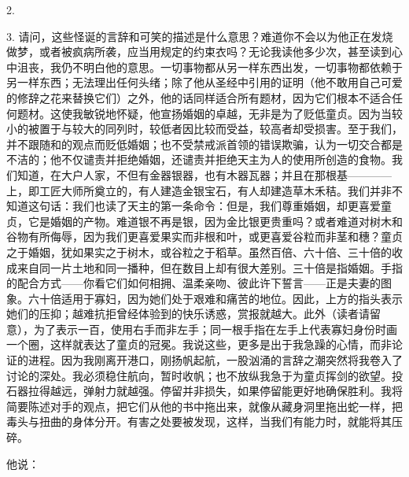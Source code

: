 2. \par

3. 请问，这些怪诞的言辞和可笑的描述是什么意思？难道你不会以为他正在发烧做梦，或者被疯病所袭，应当用规定的约束衣吗？无论我读他多少次，甚至读到心中沮丧，我仍不明白他的意思。一切事物都从另一样东西出发，一切事物都依赖于另一样东西；无法理出任何头绪；除了他从圣经中引用的证明（他不敢用自己可爱的修辞之花来替换它们）之外，他的话同样适合所有题材，因为它们根本不适合任何题材。这使我敏锐地怀疑，他宣扬婚姻的卓越，无非是为了贬低童贞。因为当较小的被置于与较大的同列时，较低者因比较而受益，较高者却受损害。至于我们，并不跟随和的观点而贬低婚姻；也不受禁戒派首领的错误欺骗，认为一切交合都是不洁的；他不仅谴责并拒绝婚姻，还谴责并拒绝天主为人的使用所创造的食物。我们知道，在大户人家，不但有金器银器，也有木器瓦器；并且在那根基————上，即工匠大师所奠立的，有人建造金银宝石，有人却建造草木禾秸。我们并非不知道这句话：我们也读了天主的第一条命令：但是，我们尊重婚姻，却更喜爱童贞，它是婚姻的产物。难道银不再是银，因为金比银更贵重吗？或者难道对树木和谷物有所侮辱，因为我们更喜爱果实而非根和叶，或更喜爱谷粒而非茎和穗？童贞之于婚姻，犹如果实之于树木，或谷粒之于稻草。虽然百倍、六十倍、三十倍的收成来自同一片土地和同一播种，但在数目上却有很大差别。三十倍是指婚姻。手指的配合方式——你看它们如何相拥、温柔亲吻、彼此许下誓言——正是夫妻的图象。六十倍适用于寡妇，因为她们处于艰难和痛苦的地位。因此，上方的指头表示她们的压抑；越难抗拒曾经体验到的快乐诱惑，赏报就越大。此外（读者请留意），为了表示一百，使用右手而非左手；同一根手指在左手上代表寡妇身份时画一个圈，这样就表达了童贞的冠冕。我说这些，更多是出于我急躁的心情，而非论证的进程。因为我刚离开港口，刚扬帆起航，一股汹涌的言辞之潮突然将我卷入了讨论的深处。我必须稳住航向，暂时收帆；也不放纵我急于为童贞挥剑的欲望。投石器拉得越远，弹射力就越强。停留并非损失，如果停留能更好地确保胜利。我将简要陈述对手的观点，把它们从他的书中拖出来，就像从藏身洞里拖出蛇一样，把毒头与扭曲的身体分开。有害之处要被发现，这样，当我们有能力时，就能将其压碎。\par

他说：\par

